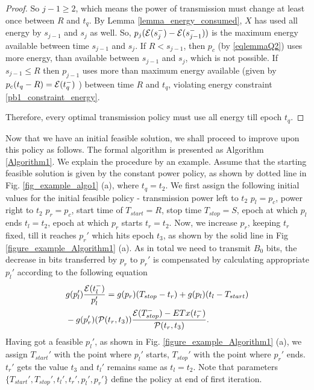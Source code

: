 \begin{proof}
So ${j-1}\ge 2$, which means the power of transmission must change at least once between $R$ and $t_q$. By Lemma \ref{lemma_energy_consumed}, $X$ has used all energy by $s_{j-1}$ and $s_{j}$ as well. So, $p_{j}(\mathcal{E}(s_{j}^-)-\mathcal{E}(s_{j-1}^-))$ is the maximum energy available between time $s_{j-1}$ and $s_{j}$. If $R<s_{j-1}$, then $p_c$ (by \eqref{eqlemmaQ2}) uses more energy, than available between $s_{j-1}$ and $s_{j}$, which is not possible. If $s_{j-1}\le R$ then $p_{j-1}$ uses more than maximum energy available (given by $p_c(t_q-R)=\mathcal{E}(t_q^-)$ ) between time $R$ and $t_q$, violating energy constraint \eqref{pb1_constraint_energy}. 

Therefore, every optimal transmission policy must use all energy till epoch $t_q$. 

\end{proof}

Now that we have an initial feasible solution, we shall proceed to improve upon this policy as follows. The formal algorithm is presented as Algorithm \ref{Algorithm1}. We explain the procedure by an example. Assume that the starting feasible solution is given by the constant power policy, as shown by dotted line in Fig. \ref{fig_example_algo1} (a), where $t_q=t_2$. We first assign the following initial values for the initial feasible policy - transmission power left to $t_2$ $p_l=p_c$, power right to $t_2$ $p_r=p_c$, start time of $T_{start}=R$, stop time $T_{stop}=S$, epoch at which $p_l$ ends $t_l=t_2$, epoch at which $p_r$ starts $t_r=t_2$. Now, we increase $p_r$, keeping $t_r$ fixed, till it reaches $p_r'$ which hits epoch $t_3$, as shown by the solid line in Fig \ref{figure_example_Algorithm1} (a). As in total we need to transmit $B_0$ bits, the decrease in bits transferred by $p_r$ to $p_r'$ is compensated by calculating appropriate $p_l'$ according to the following equation
\begin{align}
&g(p_l')\frac{\mathcal{E}(t_l^-)}{p_l'}=g(p_r)(T_{stop}-t_r)+g(p_l)(t_l-T_{start})\nonumber\\
&-g(p_r')(\mathcal{P}(t_r,t_3))\frac{\mathcal{E}(T_{stop}^-)-ETx(t_r^-)}{\mathcal{P}(t_r,t_3)}.
\end{align}   
Having got a feasible $p_l'$, as shown in Fig. \ref{figure_example_Algorithm1} (a), we assign $T_{start}'$ with the point where $p_l'$ starts, $T_{stop}'$ with the point where $p_r'$ ends. $t_r'$ gets the value $t_3$ and $t_l'$ remains same as $t_l=t_2$. Note that parameters $\{T_{start}',T_{stop}',t_l',t_r',p_l',p_r'\}$ define the policy at end of first iteration. 

